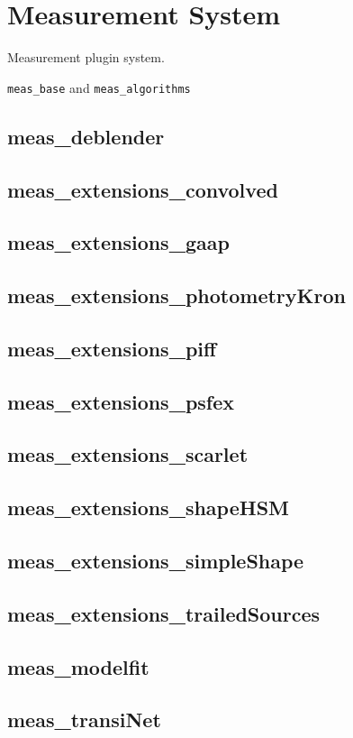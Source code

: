 \section{Measurement System}

Measurement plugin system.

\texttt{meas\_base} and \texttt{meas\_algorithms}


\subsection{meas\_deblender}
\subsection{meas\_extensions\_convolved}
\subsection{meas\_extensions\_gaap}
\subsection{meas\_extensions\_photometryKron}
\subsection{meas\_extensions\_piff}
\subsection{meas\_extensions\_psfex}
\subsection{meas\_extensions\_scarlet}
\subsection{meas\_extensions\_shapeHSM}
\subsection{meas\_extensions\_simpleShape}
\subsection{meas\_extensions\_trailedSources}
\subsection{meas\_modelfit}
\subsection{meas\_transiNet}
